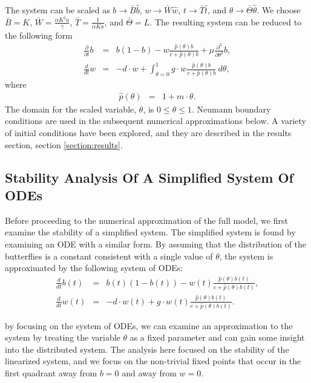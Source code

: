 \documentclass[12pt]{article}
\begin{document}
The system can be scaled as $b\rightarrow \bar{B}\hat{b}$,
$w\rightarrow \bar{W}\hat{w}$, $t\rightarrow \bar{T}\hat{t}$, and
$\theta\rightarrow \bar{\Theta}\hat{\theta}$. We choose $\bar{B}=K$,
$\bar{W}=\frac{\alpha K^2 a}{\gamma}$, $\bar{T}=\frac{1}{\alpha K a}$,
and $\bar{\Theta}=L$. The resulting system can be reduced to the
following form
\begin{eqnarray}
  \label{eq:scaledodePDE1}
  \frac{\partial}{\partial t} b & = &
      b (1 - b)
      -  w \frac{\hat{p}(\theta) b}{c+\hat{p}(\theta)b}
      + \mu \frac{\partial^2}{\partial \theta^2} b , \\
  \label{eq:scaledodePDE2}
  \frac{d}{dt} w & = & -d \cdot w +
      \int^1_{\theta=0} g \cdot w \frac{\hat{p}(\theta) b }{c + \hat{p}(\theta) b} ~ d\theta,
\end{eqnarray}
where
\begin{eqnarray}
  \hat{p}(\theta) & = & 1 + m \cdot \theta.
\end{eqnarray}
The domain for the scaled variable, $\theta$, is $0\leq\theta\leq 1$.
Neumann boundary conditions are used in the subsequent numerical
approximations below. A variety of initial conditions have been
explored, and they are described in the results section, section
\ref{section:results}.


\subsection{Stability Analysis Of A Simplified System Of ODEs}

Before proceeding to the numerical approximation of the full model, we
first examine the stability of a simplified system. The simplified
system is found by examining an ODE with a similar form. By assuming
that the distribution of the butterflies is a constant consistent with
a single value of $\theta$, the system is approximated by the
following system of ODEs:
\begin{eqnarray}
  \label{eq:scaledODE1}
  \frac{d}{dt} b(t) & = &
      b(t) (1 - b(t))
      -  w(t) \frac{\hat{p}(\theta) b(t)}{c+\hat{p}(\theta)b(t)}, \\
  \label{eq:scaledODE2}
  \frac{d}{dt} w(t) & = & -d \cdot w(t) +
       g \cdot w(t) \frac{\hat{p}(\theta) b(t) }{c + \hat{p}(\theta) b(t)}.
\end{eqnarray}

by focusing on the system of ODEs, we can examine an approximation to
the system by treating the variable $\theta$ as a fixed parameter and
can gain some insight into the distributed system. The analysis here
focused on the stability of the linearized system, and we focus on the
non-trivial fixed points that occur in the first quadrant away from
$b=0$ and away from $w=0$.
\end{document}
